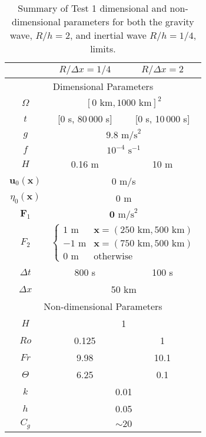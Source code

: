   \def\arraystretch{1.25} %
  \begin{table}[H]
    \begin{center}
      \begin{tabular}{|c|c|c|}
        \hline
        & $R/\Delta x = 1/4$ & $R/\Delta x = 2$ \\[0.1em] \hline \hline
        \multicolumn{3}{|c|}{Dimensional Parameters} \\ \hline
        $\Omega$ & \multicolumn{2}{c|}{$[0\text{ km}, 1000\text{ km}]^2$} \\ \hline
        $t$ & [0 s, 80\,000 s] & [0 s, 10\,000 s] \\ \hline
        $g$ & \multicolumn{2}{c|}{$9.8\text{ m/s}^2$} \\ \hline 
        $f$ & \multicolumn{2}{c|}{$10^{-4}\text{ s}^{-1}$} \\ \hline
        $H$ & 0.16 m & 10 m \\ \hline
        $\mathbf{u}_0(\mathbf{x})$ & \multicolumn{2}{c|}{0 m/s} \\ \hline
        $\eta_0(\mathbf{x})$ & \multicolumn{2}{c|}{0 m} \\ \hline
        $\mathbf{F}_1$ & \multicolumn{2}{c|}{ $\mathbf{0}\text{ m/s}^2$} \\ \hline
        $F_2$ & \multicolumn{2}{c|}{$
          \begin{cases} 
            1\text{ m} & \mathbf{x} = (250\text{ km}, 500\text{ km}) \\
            -1\text{ m} & \mathbf{x} = (750\text{ km}, 500\text{ km}) \\
            0\text{ m} & \text{otherwise}
          \end{cases}$} \\ \hline
        $\Delta t$ & 800 s & 100 s \\ \hline
        $\Delta x$ & \multicolumn{2}{c|}{50 km} \\ \hline \hline
        \multicolumn{3}{|c|}{Non-dimensional Parameters} \\ \hline
        $H$ & \multicolumn{2}{c|}{1} \\ \hline \hline
        $Ro$ & 0.125 & 1 \\ \hline
        $Fr$ & 9.98 & 10.1 \\ \hline
        $\Theta$ & 6.25 & 0.1 \\ \hline
        $k$ & \multicolumn{2}{c|}{0.01} \\ \hline
        $h$ & \multicolumn{2}{c|}{0.05} \\ \hline \hline
        $C_g$ & \multicolumn{2}{c|}{$\sim 20$} \\ \hline
      \end{tabular}
      \caption{Summary of Test 1 dimensional and non-dimensional parameters for
      both the gravity wave, $R/h = 2$, and inertial wave $R/h = 1/4$, limits.}
      \label{tab:HFElevationParams}
    \end{center}
  \end{table}

